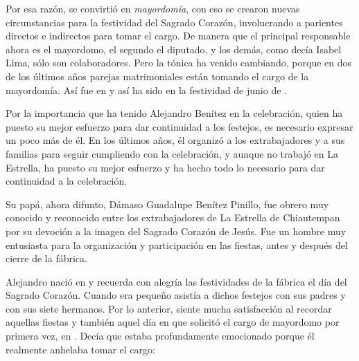 \documentclass[14pt,letterpaper,twoside]{extbook} %
\begin{document}
Por esa razón, se convirtió en \textit{mayordomía}, con eso se crearon nuevas circunstancias para la festividad del Sagrado Corazón, involucrando a parientes directos e indirectos para tomar el cargo. De manera que el principal responsable ahora es el mayordomo, el segundo el diputado, y los demás, como decía Isabel Lima, sólo son colaboradores. Pero la tónica ha venido cambiando, porque en dos de los últimos años parejas matrimoniales están tomando el cargo de la mayordomía. Así fue en  y así ha sido en la festividad de junio de .

Por la importancia que ha tenido Alejandro Benítez en la celebración, quien ha puesto su mejor esfuerzo para dar continuidad a los festejos, es necesario expresar un poco más de él. En los últimos años, él organizó a los extrabajadores y a sus familias para seguir cumpliendo con la celebración, y aunque no trabajó en La Estrella, ha puesto su mejor esfuerzo y ha hecho todo lo necesario para dar continuidad a la celebración.

Su papá, ahora difunto, Dámaso Guadalupe Benítez Pinillo, fue obrero muy conocido y reconocido entre los extrabajadores de La Estrella de Chiautempan por su devoción a la imagen del Sagrado Corazón de Jesús. Fue un hombre muy entusiasta para la organización y participación en las fiestas, antes y después del cierre de la fábrica.

Alejandro nació en  y recuerda con alegría las festividades de la fábrica el día del Sagrado Corazón. Cuando era pequeño asistía a dichos festejos con sus padres y con sus siete hermanos. Por lo anterior, siente mucha satisfacción al recordar aquellas fiestas y también aquel día en que solicitó el cargo de mayordomo por primera vez, en . Decía que estaba profundamente emocionado porque él realmente anhelaba tomar el cargo:
\end{document}
